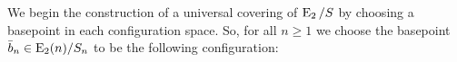 \begin{const}\label{con:unicover} We begin the construction of a universal
covering of $\operatorname{E}_2 \slash S$ by choosing a basepoint in each configuration space.
So, for all $n \geq 1$ we choose the basepoint $\bar{b}_n \in \operatorname{E}_2(n) \slash
S_n$ to be the following configuration:
\begin{center}
\end{center}


\end{const}
